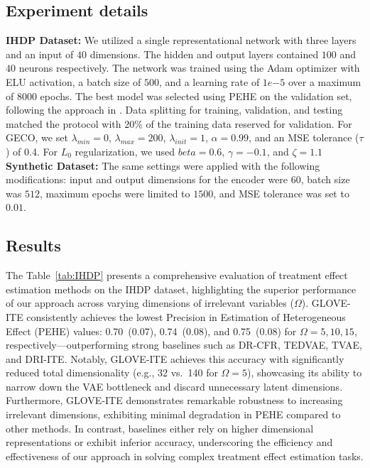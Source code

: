 \documentclass[doubleblind]{ecai}
\begin{document}
	\subsection{Experiment details}
	\textbf{IHDP Dataset:}
	We utilized a single representational network with three layers and an input of $40$ dimensions. The hidden and output layers contained $100$ and $40$ neurons respectively. The network was trained using the Adam optimizer with ELU activation, a batch size of $500$, and a learning rate of $1{e}{-5}$ over a maximum of $8000$ epochs. The best model was selected using PEHE on the validation set, following the approach in \citet{UriSha}. Data splitting for training, validation, and testing matched the protocol with $20$\% of the training data reserved for validation. For GECO, we set $\lambda_{min}=0$, 
	$\lambda_{max}=200$, $\lambda_{init}=1$, $\alpha=0.99$, and an MSE tolerance ($\tau$) of 0.4. For $L_0$ regularization, we used $beta=0.6$, $\gamma=-0.1$, and $\zeta=1.1$
	\textbf{Synthetic Dataset:}
	The same settings were applied with the following modifications: input and output dimensions for the encoder were $60$, batch size was $512$, maximum epochs were limited to $1500$, and MSE tolerance was set to $0.01$.
	
	
	\subsection{Results}
		
	The Table~\ref{tab:IHDP} presents a comprehensive evaluation of treatment effect estimation methods on the IHDP dataset, highlighting the superior performance of our approach across varying dimensions of irrelevant variables ($\Omega$). GLOVE-ITE consistently achieves the lowest Precision in Estimation of Heterogeneous Effect (PEHE) values: 0.70~(0.07), 0.74~(0.08), and 0.75~(0.08) for $\Omega=5,10,15$, respectively---outperforming strong baselines such as DR-CFR, TEDVAE, TVAE, and DRI-ITE. Notably, GLOVE-ITE achieves this accuracy with significantly reduced total dimensionality (e.g., 32 vs.\ 140 for $\Omega=5$), showcasing its ability to narrow down the VAE bottleneck and discard unnecessary latent dimensions. Furthermore, GLOVE-ITE demonstrates remarkable robustness to increasing irrelevant dimensions, exhibiting minimal degradation in PEHE compared to other methods. In contrast, baselines either rely on higher dimensional representations or exhibit inferior accuracy, underscoring the efficiency and effectiveness of our approach in solving complex treatment effect estimation tasks.
	
\end{document}
